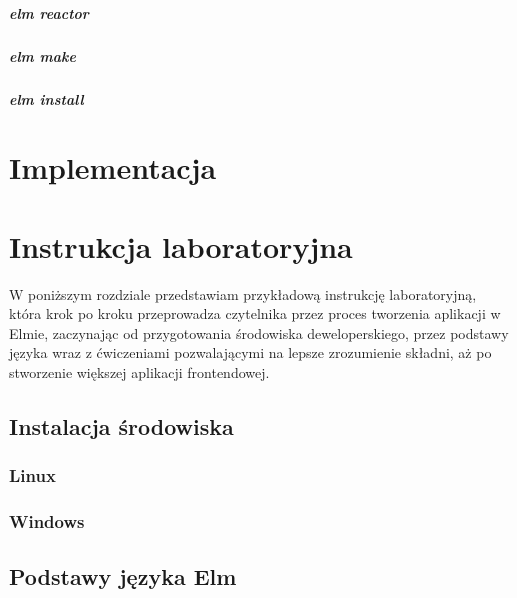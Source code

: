 \documentclass[twoside,a4paper]{report}
\begin{document}
\paragraph{elm reactor}

\paragraph{elm make}

\paragraph{elm install}



\chapter{Implementacja}


\chapter{Instrukcja laboratoryjna}
W poniższym rozdziale przedstawiam przykładową instrukcję laboratoryjną, która krok po kroku przeprowadza czytelnika przez proces tworzenia aplikacji w Elmie, zaczynając od przygotowania środowiska deweloperskiego, przez podstawy języka wraz z ćwiczeniami pozwalającymi na lepsze zrozumienie składni, aż po stworzenie większej aplikacji frontendowej.

\section{Instalacja środowiska}

\subsection{Linux}

\subsection{Windows}

\section{Podstawy języka Elm}
\end{document}
